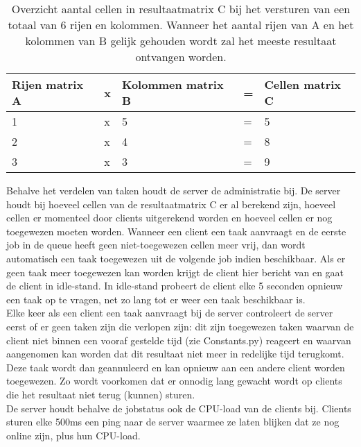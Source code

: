 \documentclass[11pt]{article}
\begin{document}
\begin{table}[H]
    \begin{tabular}{|ll|lll}
    \hline
    Rijen matrix A & x & Kolommen matrix B & = & Cellen matrix C \\ \hline
    1              & x & 5                 & = & 5               \\
    2              & x & 4                 & = & 8               \\
    3              & x & 3                 & = & 9               \\ \hline
    \end{tabular}
    \caption{Overzicht aantal cellen in resultaatmatrix C bij het versturen van een totaal van 6
    rijen en kolommen. Wanneer het aantal rijen van A en het kolommen van B gelijk gehouden wordt
    zal het meeste resultaat ontvangen worden.}
\end{table}

Behalve het verdelen van taken houdt de server de administratie bij. De server houdt bij hoeveel
cellen van de resultaatmatrix C er al berekend zijn, hoeveel cellen er momenteel door clients
uitgerekend worden en hoeveel cellen er nog toegewezen moeten worden. Wanneer een client een
taak aanvraagt en de eerste job in de queue heeft geen niet-toegewezen cellen meer vrij, dan
wordt automatisch een taak toegewezen uit de volgende job indien beschikbaar. Als er geen taak
meer toegewezen kan worden krijgt de client hier bericht van en gaat de client in idle-stand.
In idle-stand probeert de client elke 5 seconden opnieuw een taak op te vragen, net zo lang tot
er weer een taak beschikbaar is.\\
Elke keer als een client een taak aanvraagt bij de server controleert de server eerst of er geen
taken zijn die verlopen zijn: dit zijn toegewezen taken waarvan de client niet binnen een vooraf
gestelde tijd (zie Constants.py) reageert en waarvan aangenomen kan worden dat dit resultaat niet
meer in redelijke tijd terugkomt. Deze taak wordt dan geannuleerd en kan opnieuw aan een andere
client worden toegewezen. Zo wordt voorkomen dat er onnodig lang gewacht wordt op clients die
het resultaat niet terug (kunnen) sturen.\\
De server houdt behalve de jobstatus ook de CPU-load van de clients bij. Clients sturen elke
500ms een ping naar de server waarmee ze laten blijken dat ze nog online zijn, plus hun CPU-load.
\end{document}
